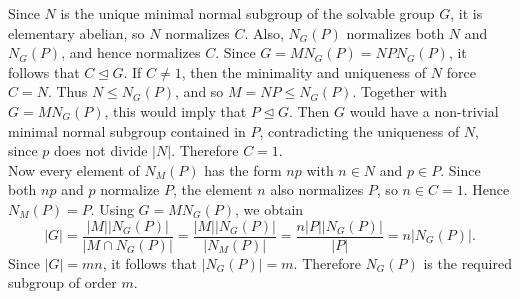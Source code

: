 \documentclass[../Odyssey_Project.tex]{subfiles}
\begin{document}
\begin{solution}
\begin{enumerate}
\[        \]
        Since $N$ is the unique minimal normal subgroup of the solvable group $G$, it is elementary abelian, so $N$ normalizes $C$. Also, $N_G(P)$ normalizes both $N$ and $N_G(P)$, and hence normalizes $C$. Since $G=MN_G(P)=NPN_G(P)$, it follows that $C\trianglelefteq G$. If $C\neq 1$, then the minimality and uniqueness of $N$ force $C=N$. Thus $N\leq N_G(P)$, and so $M=NP\leq N_G(P)$. Together with $G=MN_G(P)$, this would imply that $P\trianglelefteq G$. Then $G$ would have a non-trivial minimal normal subgroup contained in $P$, contradicting the uniqueness of $N$, since $p$ does not divide $\lvert N\rvert$. Therefore $C=1$.\\
        Now every element of $N_M(P)$ has the form $np$ with $n\in N$ and $p\in P$. Since both $np$ and $p$ normalize $P$, the element $n$ also normalizes $P$, so $n\in C=1$. Hence $N_M(P)=P$. Using $G=MN_G(P)$, we obtain
        \[
            \lvert G\rvert
            =\frac{\lvert M\rvert\lvert N_G(P)\rvert}{\lvert M\cap N_G(P)\rvert}
            =\frac{\lvert M\rvert\lvert N_G(P)\rvert}{\lvert N_M(P)\rvert}
            =\frac{n\lvert P\rvert\lvert N_G(P)\rvert}{\lvert P\rvert}
            =n\lvert N_G(P)\rvert.
        \]
        Since $\lvert G\rvert=mn$, it follows that $\lvert N_G(P)\rvert=m$. Therefore $N_G(P)$ is the required subgroup of order $m$.
    \end{enumerate}
\end{solution}
\end{document}

